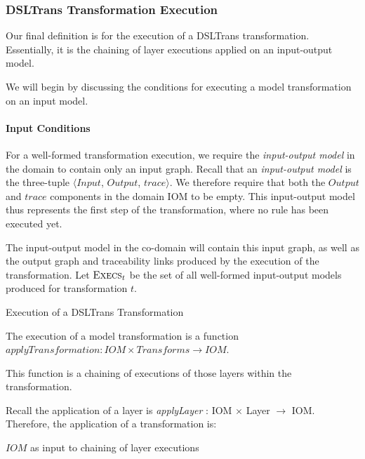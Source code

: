 

\subsubsection*{DSLTrans Transformation Execution}

Our final definition is for the execution of a DSLTrans transformation. Essentially, it is the chaining of layer executions applied on an input-output model.

We will begin by discussing the conditions for executing a model transformation on an input model.


\paragraph{Input Conditions}

For a well-formed transformation execution, we require the \textit{input-output model} in the domain to contain only an input graph. Recall that an \textit{input-output model} is the three-tuple $\big\langle \mathit{Input}$, $\mathit{Output}$, $\mathit{trace}\big\rangle$. We therefore require that both the $\mathit{Output}$ and $\mathit{trace}$ components in the domain IOM to be empty. This input-output model thus represents the first step of the transformation, where no rule has been executed yet.

The input-output model in the co-domain will contain this input graph, as well as the output graph and traceability links produced by the execution of the transformation. Let $\textsc{Execs}_t$ be the set of all well-formed input-output models produced for transformation $t$.

\begin{definition} {Execution of a DSLTrans Transformation\\}
\label{def:DSLTrans_transformation_execution} 

The execution of a model transformation is a function $\mathit{applyTransformation}: \mathit{IOM} \times \mathit{Transforms} \rightarrow \mathit{IOM}$.

This function is a chaining of executions of those layers within the transformation.

Recall the application of a layer is \textit{applyLayer} : IOM $\times$ Layer $\rightarrow$ IOM. Therefore, the application of a transformation is:

$\mathit{IOM}$ as input to chaining of layer executions 


\end{definition}


